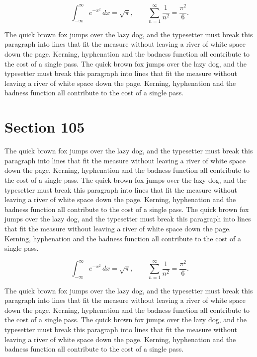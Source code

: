 \documentclass{article}
\begin{document}
\begin{equation}
\int_{-\infty}^{\infty} e^{-x^{2}}\,dx = \sqrt{\pi}, \qquad
\sum_{n=1}^{\infty} \frac{1}{n^{2}} = \frac{\pi^{2}}{6}.
\end{equation}

The quick brown fox jumps over the lazy dog, and the typesetter must break this paragraph into lines that fit the measure without leaving a river of white space down the page. Kerning, hyphenation and the badness function all contribute to the cost of a single pass. The quick brown fox jumps over the lazy dog, and the typesetter must break this paragraph into lines that fit the measure without leaving a river of white space down the page. Kerning, hyphenation and the badness function all contribute to the cost of a single pass. 
\section{Section 105}
The quick brown fox jumps over the lazy dog, and the typesetter must break this paragraph into lines that fit the measure without leaving a river of white space down the page. Kerning, hyphenation and the badness function all contribute to the cost of a single pass. The quick brown fox jumps over the lazy dog, and the typesetter must break this paragraph into lines that fit the measure without leaving a river of white space down the page. Kerning, hyphenation and the badness function all contribute to the cost of a single pass. The quick brown fox jumps over the lazy dog, and the typesetter must break this paragraph into lines that fit the measure without leaving a river of white space down the page. Kerning, hyphenation and the badness function all contribute to the cost of a single pass. 

\begin{equation}
\int_{-\infty}^{\infty} e^{-x^{2}}\,dx = \sqrt{\pi}, \qquad
\sum_{n=1}^{\infty} \frac{1}{n^{2}} = \frac{\pi^{2}}{6}.
\end{equation}

The quick brown fox jumps over the lazy dog, and the typesetter must break this paragraph into lines that fit the measure without leaving a river of white space down the page. Kerning, hyphenation and the badness function all contribute to the cost of a single pass. The quick brown fox jumps over the lazy dog, and the typesetter must break this paragraph into lines that fit the measure without leaving a river of white space down the page. Kerning, hyphenation and the badness function all contribute to the cost of a single pass. 
\end{document}
